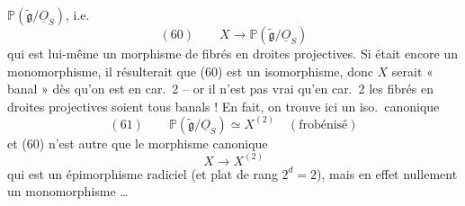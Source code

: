 \documentclass[11pt,a4paper]{article}
\begin{document}
$\mathbb{P}(\widetilde{\mathfrak{g}}/\underline{O}_S)$, \struck{\ill{}} i.e.
\[
  (60) \qquad X \longrightarrow \mathbb{P}(\widetilde{\mathfrak{g}}/\underline{O}_S)
\]
qui est lui-même un morphisme de fibrés en droites projectives.
Si   était encore un monomorphisme, il
 résulterait que (60) est un isomorphisme, donc $X$ serait « banal »
dès qu'on est en car.~2 -- or il n'est pas vrai qu'en car.~2 les fibrés en droites
projectives soient tous banals !
En fait, on trouve ici un iso.\ canonique
\[
  (61) \qquad \mathbb{P}(\widetilde{\mathfrak{g}}/\underline{O}_S) \simeq X^{(2)}
  \quad (\text{frobénisé})
\]
et (60) n'est autre que le morphisme canonique
\[
  X \longrightarrow X^{(2)}
\]
qui est un épimorphisme radiciel (et plat  de rang $2^d = 2$),
mais en effet nullement un monomorphisme \ldots
{}
\end{document}
